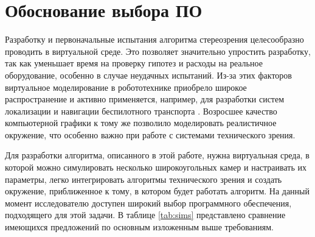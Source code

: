 \section{Обоснование выбора ПО}

Разработку и первоначальные испытания алгоритма стереозрения целесообразно проводить в виртуальной среде. Это позволяет значительно упростить разработку, 
так как уменьшает время на проверку гипотез и расходы на реальное оборудование, особенно в случае неудачных испытаний. Из-за этих факторов виртуальное моделирование 
в робототехнике приобрело широкое распространение и активно применяется, например, для разработки систем локализации и навигации беспилотного транспорта \cite{}. 
Возросшее качество компьютерной графики к тому же позволило моделировать реалистичное окружение, что особенно важно при работе с системами технического зрения. 

Для разработки алгоритма, описанного в этой работе, нужна виртуальная среда, в которой можно симулировать несколько широкоугольных камер и настраивать их параметры, 
легко интегрировать алгоритмы технического зрения и создать окружение, приближенное к тому, в котором будет работать алгоритм. На данный момент исследователю доступен 
широкий выбор программного обеспечения, подходящего для этой задачи. В таблице \ref{tab:sims} представлено сравнение имеющихся предложений по основным изложенным выше 
требованиям.

